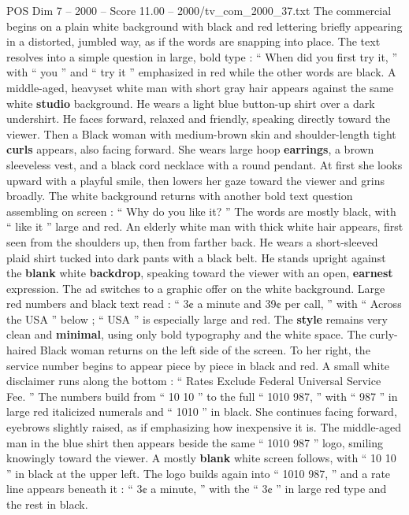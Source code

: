 \begin{textsample}{POS Dim 7 – 2000 – Score 11.00 – 2000/tv\_com\_2000\_37.txt}  \label{ex:f7_pos_071}
The commercial begins on a plain white background with black and red lettering briefly appearing in a distorted, jumbled way, as if the words are snapping into place.
The text resolves into a simple question in large, bold type : “ When did you first try it, ” with “ you ” and “ try it ” emphasized in red while the other words are black.
A middle-aged, heavyset white man with short gray hair appears against the same white \textbf{studio} background.
He wears a light blue button-up shirt over a dark undershirt.
He faces forward, relaxed and friendly, speaking directly toward the viewer.
Then a Black woman with medium-brown skin and shoulder-length tight \textbf{curls} appears, also facing forward.
She wears large hoop \textbf{earrings}, a brown sleeveless vest, and a black cord necklace with a round pendant.
At first she looks upward with a playful smile, then lowers her gaze toward the viewer and grins broadly.
The white background returns with another bold text question assembling on screen : “ Why do you like it? ” The words are mostly black, with “ like it ” large and red.
An elderly white man with thick white hair appears, first seen from the shoulders up, then from farther back.
He wears a short-sleeved plaid shirt tucked into dark pants with a black belt.
He stands upright against the \textbf{blank} white \textbf{backdrop}, speaking toward the viewer with an open, \textbf{earnest} expression.
The ad switches to a graphic offer on the white background.
Large red numbers and black text read : “ 3¢ a minute and 39¢ per call, ” with “ Across the USA ” below ; “ USA ” is especially large and red.
The \textbf{style} remains very clean and \textbf{minimal}, using only bold typography and the white space.
The curly-haired Black woman returns on the left side of the screen.
To her right, the service number begins to appear piece by piece in black and red.
A small white disclaimer runs along the bottom : “ Rates Exclude Federal Universal Service Fee. ” The numbers build from “ 10 10 ” to the full “ 1010 987, ” with “ 987 ” in large red italicized numerals and “ 1010 ” in black.
She continues facing forward, eyebrows slightly raised, as if emphasizing how inexpensive it is.
The middle-aged man in the blue shirt then appears beside the same “ 1010 987 ” logo, smiling knowingly toward the viewer.
A mostly \textbf{blank} white screen follows, with “ 10 10 ” in black at the upper left.
The logo builds again into “ 1010 987, ” and a rate line appears beneath it : “ 3¢ a minute, ” with the “ 3¢ ” in large red type and the rest in black.

\end{textsample}
